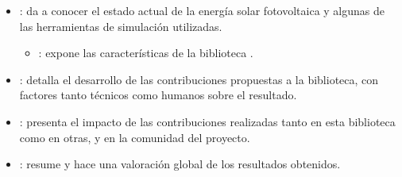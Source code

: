 \begin{itemize}

    \item {}: da a conocer el estado actual de la energía solar fotovoltaica y algunas de las herramientas de simulación utilizadas.

        \begin{itemize}
            \item {}: expone las características de la biblioteca \pvlibpy.
        \end{itemize}

    \item {}: detalla el desarrollo de las contribuciones propuestas a la biblioteca, con factores tanto técnicos como humanos sobre el resultado.

    \item {}: presenta el impacto de las contribuciones realizadas tanto en esta biblioteca como en otras, y en la comunidad del proyecto.

    \item {}: resume y hace una valoración global de los resultados obtenidos.


\end{itemize}


